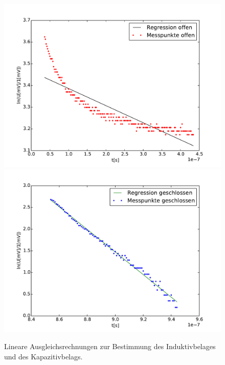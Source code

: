 \begin{figure}
	\centering
	\includegraphics[width = 14cm]{data/c/Regression1.pdf}
	\includegraphics[width = 14cm]{data/c/Regression2.pdf}
	\caption{Lineare Ausgleichsrechnungen zur Bestimmung des Induktivbelages und des Kapazitivbelags.}
	\label{fig_fit1}
\end{figure}
